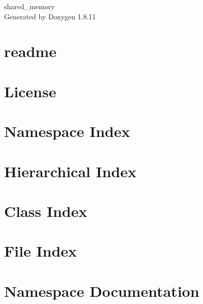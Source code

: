 \documentclass[twoside]{book}
\newcommand{\+}{\discretionary{\mbox{\scriptsize$\hookleftarrow$}}{}{}}
\newcommand{\clearemptydoublepage}{%
  \newpage{\pagestyle{empty}\cleardoublepage}%
}
\begin{document}
\hypersetup{pageanchor=false,
             bookmarksnumbered=true,
             pdfencoding=unicode
            }
\begin{titlepage}
\vspace*{7cm}
\begin{center}%
{\Large shared\+\_\+memory }\\
\vspace*{1cm}
{\large Generated by Doxygen 1.8.11}\\
\end{center}
\end{titlepage}
\clearemptydoublepage
\tableofcontents
\clearemptydoublepage
{}
\hypersetup{pageanchor=true}

\chapter{readme}
\label{md_readme}
\hypertarget{md_readme}{}

\chapter{License}
\label{license}
\hypertarget{license}{}

\chapter{Namespace Index}

\chapter{Hierarchical Index}

\chapter{Class Index}

\chapter{File Index}

\chapter{Namespace Documentation}

\end{document}
